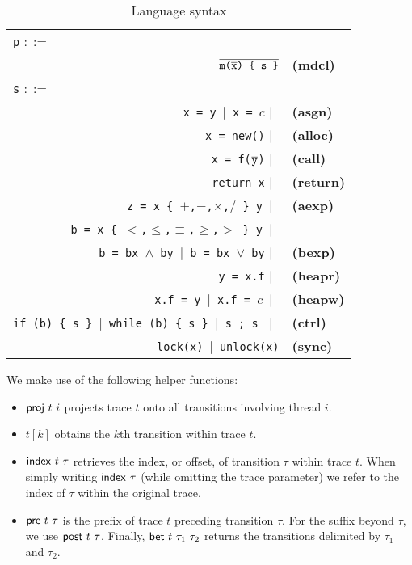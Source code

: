 \begin{table}
	\begin{center}
	\begin{tabular}{rl}
						\multicolumn{1}{l}{{\tt p} $::=$} & \\
					    $\overline{\texttt{m($\overline{{\tt x}}$) \{ s \}}}$ & {\bf (mdcl)} \\
						\multicolumn{1}{l}{{\tt s} $::=$} & \\
						{\tt x = y}\ $|$\ {\tt x = $c$} $|$\ & {\bf (asgn)} \\
						{\tt x = new()} $|$\ & {\bf (alloc)} \\
						{\tt x = f($\overline{{\tt y}}$)} $|$\ & {\bf (call)} \\
						{\tt return x} $|$\ & {\bf (return)} \\
						{\tt z = x \{ $+$,$-$,$\times$,$/$ \} y}\ $|$\ & {\bf (aexp)} \\
						{\tt b = x \{ $<$,$\leq$,$\equiv$,$\geq$,$>$ \} y}\ $|$\ & \\
						{\tt b = bx $\wedge$ by}\ $|$\ {\tt b = bx $\vee$ by} $|$\ & {\bf (bexp)} \\
						{\tt y = x.f} $|$\ & {\bf (heapr)} \\ 
						{\tt x.f = y}\ $|$\ {\tt x.f = $c$}\ $|$\ & {\bf (heapw)} \\
						{\tt if (b) \{ s \} $|$\ {\tt while (b) \{  s \}} $|$\ {\tt s ; s }} $|$\ & {\bf (ctrl)} \\
						{\tt lock(x)}\ $|$\ {\tt unlock(x)} & {\bf (sync)}
	\end{tabular}
	\end{center}
	\caption{\label{Ta:syntax}Language syntax}
\end{table}

We make use of the following helper functions:
\begin{itemize}
	\item ${\sf proj}\ t\ i$ projects trace $t$ onto all transitions involving thread $i$.
	\item $t[k]$ obtains the $k$th transition within trace $t$.
	\item ${\sf index}\ t\ \tau$ retrieves the index, or offset, of transition $\tau$ within trace $t$. When simply writing
	 ${\sf index}\ \tau$ (while omitting the trace parameter) we refer to the index of $\tau$ within the original trace. 
	\item ${\sf pre}\ t\ \tau$ is the prefix of trace $t$ preceding transition $\tau$. For the suffix beyond $\tau$, we 
	use ${\sf post}\ t\ \tau$. Finally, ${\sf bet}\ t\ \tau_1\ \tau_2$ returns the transitions delimited by $\tau_1$ and $\tau_2$.
\end{itemize}

